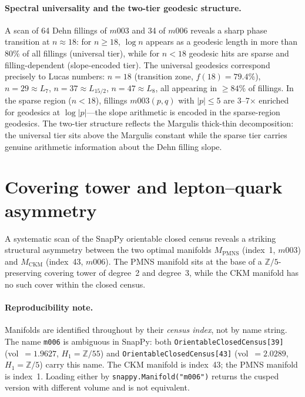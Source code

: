 ﻿\documentclass[12pt]{article}
\theoremstyle{definition}
\begin{document}
\paragraph{Spectral universality and the two-tier geodesic structure.}
A scan of 64 Dehn fillings of $m003$ and 34 of $m006$ reveals a sharp
phase transition at $n \approx 18$: for $n \geq 18$, $\log n$ appears
as a geodesic length in more than 80\% of all fillings (universal tier),
while for $n < 18$ geodesic hits are sparse and filling-dependent
(slope-encoded tier). The universal geodesics correspond precisely to
Lucas numbers: $n = 18$ (transition zone, $f(18)=79.4\%$), $n = 29 \approx L_7$,
$n = 37 \approx L_{15/2}$, $n = 47 \approx L_8$, all appearing in
$\geq 84\%$ of fillings. In the sparse region ($n < 18$), fillings
$m003(p,q)$ with $|p| \leq 5$ are 3--7$\times$ enriched for geodesics
at $\log|p|$---the slope arithmetic is encoded in the sparse-region
geodesics. The two-tier structure reflects the Margulis thick-thin
decomposition: the universal tier sits above the Margulis constant
while the sparse tier carries genuine arithmetic information about the
Dehn filling slope.


\section{Covering tower and lepton--quark asymmetry}
\label{sec:covering_tower}

A systematic scan of the SnapPy orientable closed census reveals
a striking structural asymmetry between the two optimal manifolds
$M_\text{PMNS}$ (index~1, $m003$) and $M_\text{CKM}$ (index~43, $m006$).
The PMNS manifold sits at the base of a $\mathbb{Z}/5$-preserving
covering tower of degree~2 and degree~3, while the CKM manifold
has no such cover within the closed census.

\paragraph{Reproducibility note.}
Manifolds are identified throughout by their \emph{census index}, not
by name string. The name \texttt{m006} is ambiguous in SnapPy: both
\texttt{OrientableClosedCensus[39]} (vol~$=1.9627$, $H_1=\mathbb{Z}/55$)
and \texttt{OrientableClosedCensus[43]} (vol~$=2.0289$, $H_1=\mathbb{Z}/5$)
carry this name. The CKM manifold is index~43; the PMNS manifold is index~1.
Loading either by \texttt{snappy.Manifold("m006")} returns the cusped version
with different volume and is not equivalent.
\end{document}
